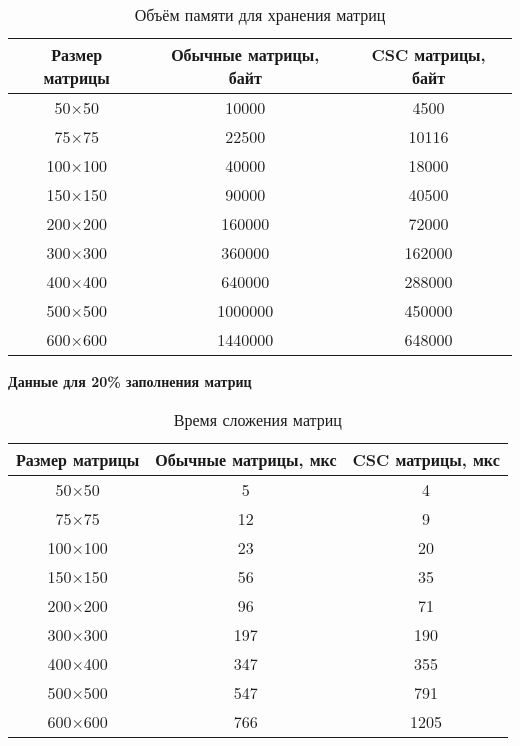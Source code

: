 \begin{table}[H]
	\centering
	\caption{Объём памяти для хранения матриц}
	\begin{tabular}{|c|c|c|}
		\hline
		Размер матрицы & Обычные матрицы, байт & CSC матрицы, байт \\ \hline
		50$\times$50         & 10000                 & 4500             \\ \hline
		75$\times$75         & 22500                 & 10116             \\ \hline
		100$\times$100        & 40000                 & 18000             \\ \hline
		150$\times$150        & 90000                 & 40500            \\ \hline
		200$\times$200        & 160000                & 72000            \\ \hline
		300$\times$300        & 360000                & 162000            \\ \hline
		400$\times$400        & 640000                & 288000            \\ \hline
		500$\times$500        & 1000000               & 450000           \\ \hline
		600$\times$600        & 1440000               & 648000           \\ \hline
	\end{tabular}
\end{table}

\newpage
\textbf{Данные для 20\% заполнения матриц}
\begin{table}[H]
	\centering
	\caption{Время сложения матриц}
	\begin{tabular}{|c|c|c|}
		\hline
		Размер матрицы & Обычные матрицы, мкс & CSC матрицы, мкс \\ \hline
		50$\times$50         & 5                    & 4                \\ \hline
		75$\times$75         & 12                   & 9                \\ \hline
		100$\times$100        & 23                   & 20                \\ \hline
		150$\times$150        & 56                   & 35               \\ \hline
		200$\times$200        & 96                   & 71               \\ \hline
		300$\times$300        & 197                  & 190               \\ \hline
		400$\times$400        & 347                  & 355              \\ \hline
		500$\times$500        & 547                  & 791              \\ \hline
		600$\times$600        & 766                  & 1205              \\ \hline
	\end{tabular}
\end{table}

